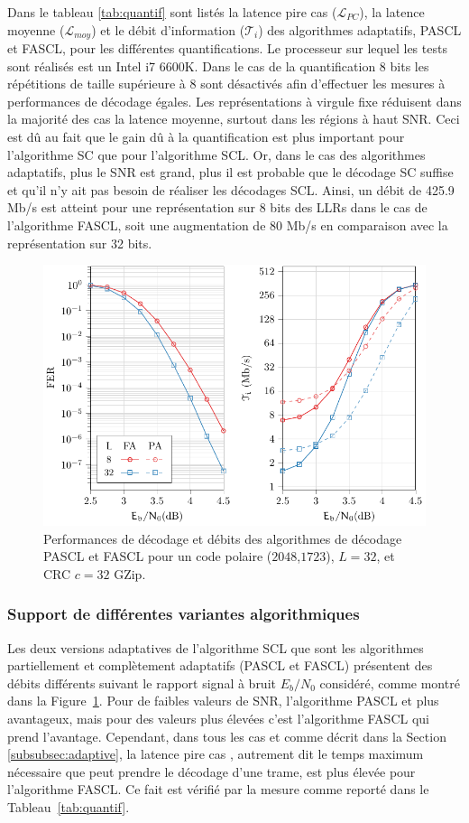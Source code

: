 Dans le tableau \ref{tab:quantif} sont listés la latence \og pire cas \fg ($\mathcal{L}_{PC}$), la latence moyenne ($\mathcal{L}_{moy}$) et le débit d'information ($\mathcal{T}_i$) des algorithmes adaptatifs, PASCL et FASCL, pour les différentes quantifications. Le processeur sur lequel les tests sont réalisés est un Intel i7 6600K. Dans le cas de la quantification 8 bits les \noeuds répétitions de taille supérieure à 8 sont désactivés afin d'effectuer les mesures à performances de décodage égales. Les représentations à virgule fixe réduisent dans la majorité des cas la latence moyenne, surtout dans les régions à haut SNR. Ceci est dû au fait que le gain dû à la quantification est plus important pour l'algorithme SC que pour l'algorithme SCL. Or, dans le cas des algorithmes adaptatifs, plus le SNR est grand, plus il est probable que le décodage SC suffise et qu'il n'y ait pas besoin de réaliser les décodages SCL. Ainsi, un débit de 425.9 Mb/s est atteint pour une représentation sur 8 bits des LLRs dans le cas de l'algorithme FASCL, soit une augmentation de 80 Mb/s en comparaison avec la représentation sur 32 bits.
\begin{figure}[t]
\includegraphics{main/ch2_fig/curves/ascl/tikz/ascl}
\caption{Performances de décodage et débits des algorithmes de décodage PASCL et FASCL pour un code polaire ($2048$,$1723$), $L=32$, et CRC $c=32$ GZip.}
\label{fig:ascl_perfs}
\end{figure}


\subsubsection{Support de différentes variantes algorithmiques}
Les deux versions adaptatives de l'algorithme SCL que sont les algorithmes partiellement et complètement adaptatifs (PASCL et FASCL) présentent des débits différents suivant le rapport signal à bruit $E_b/N_0$ considéré, comme montré dans la Figure~\ref{fig:ascl_perfs}. Pour de faibles valeurs de SNR, l'algorithme PASCL et plus avantageux, mais pour des valeurs plus élevées c'est l'algorithme FASCL qui prend l'avantage. Cependant, dans tous les cas et comme décrit dans la Section \ref{subsubsec:adaptive}, la latence \og pire cas \fg, autrement dit le temps maximum nécessaire que peut prendre le décodage d'une trame, est plus élevée pour l'algorithme FASCL. Ce fait est vérifié par la mesure comme reporté dans le Tableau~\ref{tab:quantif}.

